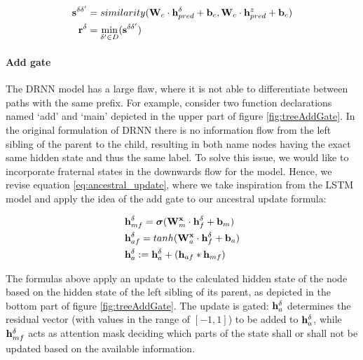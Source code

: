 \begin{align}
    \mathbf{s}^{\delta \delta'} &= similarity(\mathbf{W}_c \cdot \mathbf{h}^\delta_{pred} + \mathbf{b}_c,  \mathbf{W}_c \cdot \mathbf{h}^z_{pred} + \mathbf{b}_c) \\
    \mathbf{r}^\delta &= \min_{\delta' \in D}(\mathbf{s}^{\delta \delta'})
\end{align}

\paragraph{Add gate} \label{par:addgate} The DRNN model has a large flaw, where it is not able to differentiate between paths with the same prefix. For example, consider two function declarations named `add' and `main' depicted in the upper part of figure \ref{fig:treeAddGate}. In the original formulation of DRNN \cite{alvarezmelis2017tree} there is no information flow from the left sibling of the parent to the child, resulting in both name nodes having the exact same hidden state and thus the same label. To solve this issue, we would like to incorporate fraternal states in the downwards flow for the model. Hence, we revise equation \ref{eq:ancestral_update}, where we take inspiration from the LSTM model and apply the idea of the add gate to our ancestral update formula:

\begin{align}
    &\mathbf{h}_{mf}^\delta = \boldsymbol\sigma(\mathbf{W}^{\mathbf{x}}_m \cdot \mathbf{h}_f^\delta + \mathbf{b}_m)\\
    &\mathbf{h}_{af}^\delta = tanh(\mathbf{W}^{\mathbf{x}}_a \cdot \mathbf{h}_f^\delta + \mathbf{b}_a)\\
    &\mathbf{h}_a^\delta := \mathbf{h}_a^\delta + (\mathbf{h}_{af} * \mathbf{h}_{mf})
\end{align}

The formulas above apply an update to the calculated hidden state of the node based on the hidden state of the left sibling of its parent, as depicted in the bottom part of figure \ref{fig:treeAddGate}. The update is gated: $\mathbf{h}_a^\delta$ determines the residual vector (with values in the range of $[-1,1]$) to be added to $\mathbf{h}_a^\delta$, while $\mathbf{h}_{mf}^\delta$ acts as attention mask deciding which parts of the state shall or shall not be updated based on the available information.


